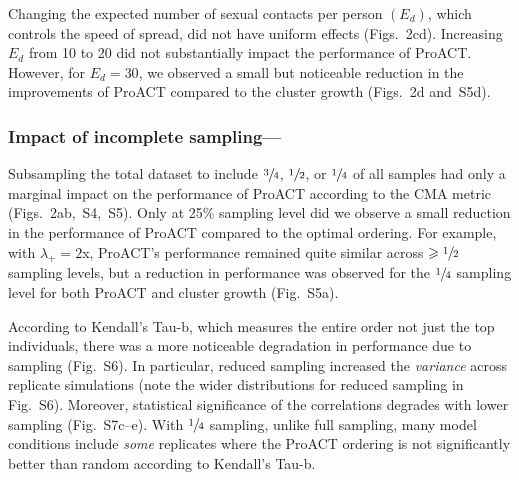 \documentclass[oupdraft]{sysbio}
\newcommand{\PLWH}{sample\xspace}
\begin{document}
Changing the expected number of sexual contacts per person $\left(E_d\right)$, which controls the speed of spread, did not have uniform effects (Figs.~2cd). 
Increasing $E_d$ from 10 to 20 did not substantially impact the performance of ProACT. However, for $E_d=30$, we observed a small but noticeable reduction in the improvements of ProACT compared to the cluster growth (Figs.~2d and~S5d).




\subsubsection{Impact of incomplete sampling---}
Subsampling the total dataset to include $\sfrac{3}{4}$, $\sfrac{1}{2}$, or $\sfrac{1}{4}$ of all \PLWH{s} had only a marginal impact on the performance of ProACT according to the CMA metric  (Figs.~2ab,~S4,~S5). 
Only at 25\% sampling level did we observe a small reduction in the performance of ProACT compared to the optimal ordering. 
For example, 
with $\lambda_{+}=2$x, ProACT's performance remained quite similar across $\geqslant \sfrac{1}{2}$ sampling levels, but a reduction in performance was observed for the $\sfrac{1}{4}$ sampling level for both ProACT and  cluster growth  (Fig.~S5a).


According to Kendall's Tau-b, which measures the entire order not just the top individuals, there was a more noticeable degradation in performance due to sampling (Fig.~S6). 
In particular, reduced sampling increased the \textit{variance} across replicate simulations (note the wider distributions for reduced sampling in Fig.~S6).
Moreover, statistical significance of the correlations degrades with lower sampling (Fig.~S7c--e).
With  $\sfrac{1}{4}$ sampling, unlike full sampling, many model conditions include {\em some} replicates where the ProACT ordering is not significantly better than random according to Kendall's Tau-b.
\end{document}
